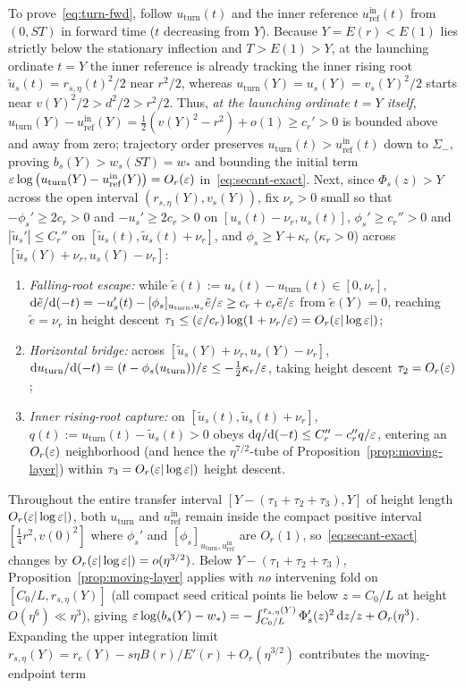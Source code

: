 To prove~\eqref{eq:turn-fwd}, follow $u_{\mathrm{turn}}(t)$ and the inner reference $u_{\mathrm{ref}}^{\mathrm{in}}(t)$ from $(0,ST)$ in forward time ($t$ decreasing from $Y$). Because $Y=E(r)<E(1)$ lies strictly below the stationary inflection and $T>E(1)>Y$, at the launching ordinate $t=Y$ the inner reference is already tracking the inner rising root $\tilde u_s(t)=r_{s,\eta}(t)^2/2$ near $r^2/2$, whereas $u_{\mathrm{turn}}(Y)=u_s(Y)=v_s(Y)^2/2$ starts near $v(Y)^2/2>d^2/2>r^2/2$. Thus, \emph{at the launching ordinate $t=Y$ itself}, $u_{\mathrm{turn}}(Y)-u_{\mathrm{ref}}^{\mathrm{in}}(Y)=\frac12(v(Y)^2-r^2)+o(1)\ge c_r'>0$ is bounded above and away from zero; trajectory order preserves $u_{\mathrm{turn}}(t)>u_{\mathrm{ref}}^{\mathrm{in}}(t)$ down to $\Sigma_-$, proving $b_s(Y)>w_s(ST)=w_*$ and bounding the initial term $\varepsilon\log\big(u_{\mathrm{turn}}(Y)-u_{\mathrm{ref}}^{\mathrm{in}}(Y)\big)=O_r(\varepsilon)$ in~\eqref{eq:secant-exact}. Next, since $\Phi_s(z)>Y$ across the open interval $(r_{s,\eta}(Y),v_s(Y))$, fix $\nu_r>0$ small so that $-\phi_s'\ge 2c_r>0$ and $-u_s'\ge 2c_r>0$ on $[u_s(t)-\nu_r,u_s(t)]$, $\phi_s'\ge c_r''>0$ and $|\tilde u_s'|\le C_r''$ on $[\tilde u_s(t),\tilde u_s(t)+\nu_r]$, and $\phi_s\ge Y+\kappa_r$ ($\kappa_r>0$) across $[\tilde u_s(Y)+\nu_r,u_s(Y)-\nu_r]$:
\begin{enumerate}
  \item[\textup{1.}] \emph{Falling-root escape:} while $\tilde e(t):=u_s(t)-u_{\mathrm{turn}}(t)\in[0,\nu_r]$, $\mathrm{d}\tilde e/\mathrm{d}(-t)=-u_s'(t)-[\phi_s]_{u_{\mathrm{turn}},u_s}\tilde e/\varepsilon\ge c_r+c_r\tilde e/\varepsilon$ from $\tilde e(Y)=0$, reaching $\tilde e=\nu_r$ in height descent $\tau_1\le(\varepsilon/c_r)\log(1+\nu_r/\varepsilon)=O_r(\varepsilon|\log\varepsilon|)$;
  \item[\textup{2.}] \emph{Horizontal bridge:} across $[\tilde u_s(Y)+\nu_r,u_s(Y)-\nu_r]$, $\mathrm{d} u_{\mathrm{turn}}/\mathrm{d}(-t)=(t-\phi_s(u_{\mathrm{turn}}))/\varepsilon\le -\tfrac12\kappa_r/\varepsilon$, taking height descent $\tau_2=O_r(\varepsilon)$;
  \item[\textup{3.}] \emph{Inner rising-root capture:} on $[\tilde u_s(t),\tilde u_s(t)+\nu_r]$, $q(t):=u_{\mathrm{turn}}(t)-\tilde u_s(t)>0$ obeys $\mathrm{d} q/\mathrm{d}(-t)\le C_r''-c_r'' q/\varepsilon$, entering an $O_r(\varepsilon)$ neighborhood (and hence the $\eta^{7/2}$-tube of Proposition~\ref{prop:moving-layer}) within $\tau_3=O_r(\varepsilon|\log\varepsilon|)$ height descent.
\end{enumerate}
Throughout the entire transfer interval $[Y-(\tau_1+\tau_2+\tau_3),Y]$ of height length $O_r(\varepsilon|\log\varepsilon|)$, both $u_{\mathrm{turn}}$ and $u_{\mathrm{ref}}^{\mathrm{in}}$ remain inside the compact positive interval $[\frac14 r^2,v(0)^2]$ where $\phi_s'$ and $[\phi_s]_{u_{\mathrm{turn}},u_{\mathrm{ref}}^{\mathrm{in}}}$ are $O_r(1)$, so~\eqref{eq:secant-exact} changes by $O_r(\varepsilon|\log\varepsilon|)=o(\eta^{3/2})$. Below $Y-(\tau_1+\tau_2+\tau_3)$, Proposition~\ref{prop:moving-layer} applies with \emph{no} intervening fold on $[C_0/L,r_{s,\eta}(Y)]$ (all compact seed critical points lie below $z=C_0/L$ at height $O(\eta^6)\ll\eta^3$), giving $\varepsilon\log(b_s(Y)-w_*)=-\int_{C_0/L}^{r_{s,\eta}(Y)}\Phi_s'(z)^2\,\mathrm{d} z/z+O_r(\eta^3)$. Expanding the upper integration limit $r_{s,\eta}(Y)=r_e(Y)-s\eta B(r)/E'(r)+O_r(\eta^{3/2})$ contributes the moving-endpoint term
